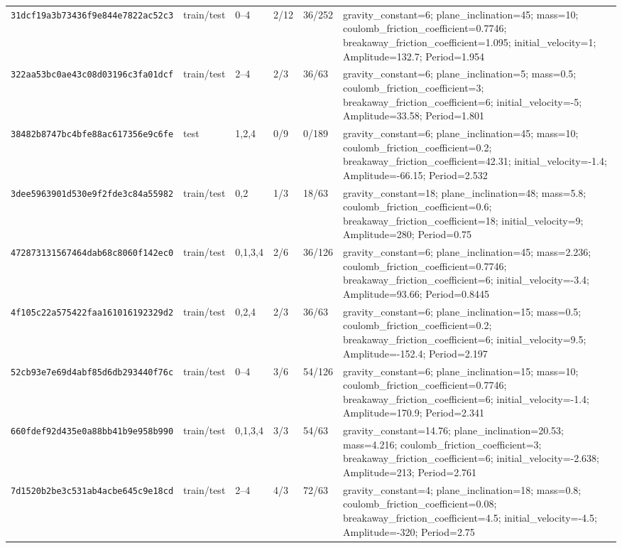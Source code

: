 \begin{tabular*}{\textwidth}{@{\extracolsep{\fill}}llllll@{}}
\texttt{31dcf19a3b73436f9e844e7822ac52c3} & train/test & 0--4 & 2/12 & 36/252 & gravity\_constant=6; plane\_inclination=45; mass=10; coulomb\_friction\_coefficient=0.7746; breakaway\_friction\_coefficient=1.095; initial\_velocity=1; Amplitude=132.7; Period=1.954 \\
\texttt{322aa53bc0ae43c08d03196c3fa01dcf} & train/test & 2--4 & 2/3 & 36/63 & gravity\_constant=6; plane\_inclination=5; mass=0.5; coulomb\_friction\_coefficient=3; breakaway\_friction\_coefficient=6; initial\_velocity=-5; Amplitude=33.58; Period=1.801 \\
\texttt{38482b8747bc4bfe88ac617356e9c6fe} & test & 1,2,4 & 0/9 & 0/189 & gravity\_constant=6; plane\_inclination=45; mass=10; coulomb\_friction\_coefficient=0.2; breakaway\_friction\_coefficient=42.31; initial\_velocity=-1.4; Amplitude=-66.15; Period=2.532 \\
\texttt{3dee5963901d530e9f2fde3c84a55982} & train/test & 0,2 & 1/3 & 18/63 & gravity\_constant=18; plane\_inclination=48; mass=5.8; coulomb\_friction\_coefficient=0.6; breakaway\_friction\_coefficient=18; initial\_velocity=9; Amplitude=280; Period=0.75 \\
\texttt{472873131567464dab68c8060f142ec0} & train/test & 0,1,3,4 & 2/6 & 36/126 & gravity\_constant=6; plane\_inclination=45; mass=2.236; coulomb\_friction\_coefficient=0.7746; breakaway\_friction\_coefficient=6; initial\_velocity=-3.4; Amplitude=93.66; Period=0.8445 \\
\texttt{4f105c22a575422faa161016192329d2} & train/test & 0,2,4 & 2/3 & 36/63 & gravity\_constant=6; plane\_inclination=15; mass=0.5; coulomb\_friction\_coefficient=0.2; breakaway\_friction\_coefficient=6; initial\_velocity=9.5; Amplitude=-152.4; Period=2.197 \\
\texttt{52cb93e7e69d4abf85d6db293440f76c} & train/test & 0--4 & 3/6 & 54/126 & gravity\_constant=6; plane\_inclination=15; mass=10; coulomb\_friction\_coefficient=0.7746; breakaway\_friction\_coefficient=6; initial\_velocity=-1.4; Amplitude=170.9; Period=2.341 \\
\texttt{660fdef92d435e0a88bb41b9e958b990} & train/test & 0,1,3,4 & 3/3 & 54/63 & gravity\_constant=14.76; plane\_inclination=20.53; mass=4.216; coulomb\_friction\_coefficient=3; breakaway\_friction\_coefficient=6; initial\_velocity=-2.638; Amplitude=213; Period=2.761 \\
\texttt{7d1520b2be3c531ab4acbe645c9e18cd} & train/test & 2--4 & 4/3 & 72/63 & gravity\_constant=4; plane\_inclination=18; mass=0.8; coulomb\_friction\_coefficient=0.08; breakaway\_friction\_coefficient=4.5; initial\_velocity=-4.5; Amplitude=-320; Period=2.75 \\

\end{tabular*}
